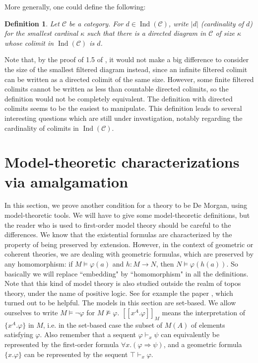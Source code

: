 \documentclass{article}
\newtheorem{definition}[theorem]{Definition}
\newcommand{\Ind}{\operatorname{Ind}}
\renewcommand{\phi}{\varphi}
\begin{document}
More generally, one could define the following:
\begin{definition}
    Let $\mathcal{C}$ be a category. For $d\in\Ind(\mathcal{C})$, write $|d|$ (cardinality of $d$) for the smallest cardinal $\kappa$ such that there is a directed diagram in $\mathcal{C}$ of size $\kappa$ whose colimit in $\Ind(\mathcal{C})$ is $d$.
\end{definition}

Note that, by the proof of 1.5 of \cite{rosicky1994locally}, it would not make a big difference to consider the size of the smallest filtered diagram instead, since an infinite filtered colimit can be written as a directed colimit of the same size. However, some finite filtered colimits cannot be written as less than countable directed colimits, so the definition would not be completely equivalent. The definition with directed colimits seems to be the easiest to manipulate. This definition leads to several interesting questions which are still under investigation, notably regarding the cardinality of colimits in $\Ind(\mathcal{C})$.

\section{Model-theoretic characterizations via amalgamation}\label{sec:model_amalg}
In this section, we prove another condition for a theory to be De Morgan, using model-theoretic tools. We will have to give some model-theoretic definitions, but the reader who is used to first-order model theory should be careful to the differences. We know that the existential formulas are characterized by the property of being preserved by extension. However, in the context of geometric or coherent theories, we are dealing with geometric formulas, which are preserved by any homomorphism: if $M\models \phi(a)$ and $h:M\xrightarrow{} N$, then $N\models \phi(h(a))$. So basically we will replace ``embedding" by ``homomorphism" in all the definitions. Note that this kind of model theory is also studied outside the realm of topos theory, under the name of positive logic. See for example the paper \cite{yaacov2007fondements}, which turned out to be helpful. The models in this section are set-based. We allow ourselves to write $M\models \neg\phi$ for $M\not\models\phi$. $[[x^A.\phi]]_M$ means the interpretation of $\{x^A.\phi\}$ in $M$, i.e. in the set-based case the subset of $M(A)$ of elements satisfying $\phi$. Also remember that a sequent $\phi\vdash_x\psi$ can equivalently be represented by the first-order formula $\forall x.(\phi\Rightarrow\psi)$, and a geometric formula $\{x.\phi\}$ can be represented by the sequent $\top\vdash_x\phi$. 
\end{document}
